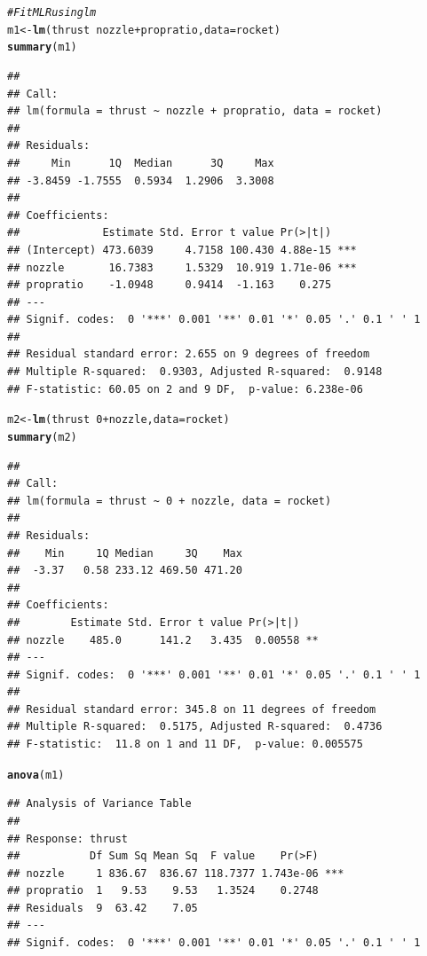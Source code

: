 \documentclass[oneside]{book}\usepackage[]{graphicx}\usepackage[dvipsnames,table,xcdraw]{xcolor}
\makeatletter
\newcommand{\hlnum}[1]{\textcolor[rgb]{0.686,0.059,0.569}{#1}}%
\newcommand{\hlcom}[1]{\textcolor[rgb]{0.678,0.584,0.686}{\textit{#1}}}%
\newcommand{\hlopt}[1]{\textcolor[rgb]{0,0,0}{#1}}%
\newcommand{\hlstd}[1]{\textcolor[rgb]{0.345,0.345,0.345}{#1}}%
\newcommand{\hlkwb}[1]{\textcolor[rgb]{0.69,0.353,0.396}{#1}}%
\newcommand{\hlkwc}[1]{\textcolor[rgb]{0.333,0.667,0.333}{#1}}%
\newcommand{\hlkwd}[1]{\textcolor[rgb]{0.737,0.353,0.396}{\textbf{#1}}}%
\newenvironment{kframe}{%
 \def\at@end@of@kframe{}%
 \ifinner\ifhmode%
  \def\at@end@of@kframe{\end{minipage}}%
  \begin{minipage}{\columnwidth}%
 \fi\fi%
 \def\FrameCommand##1{\hskip\@totalleftmargin \hskip-\fboxsep
 \colorbox{shadecolor}{##1}\hskip-\fboxsep
     \hskip-\linewidth \hskip-\@totalleftmargin \hskip\columnwidth}%
 \MakeFramed {\advance\hsize-\width
   \@totalleftmargin\z@ \linewidth\hsize
   \@setminipage}}%
 {\par\unskip\endMakeFramed%
 \at@end@of@kframe}
\newenvironment{knitrout}{}{} %
\makeatother
\begin{document}
\begin{knitrout}
\color{fgcolor}\begin{kframe}
\begin{alltt}
\hlcom{# Fit MLR using lm}
\hlstd{m1} \hlkwb{<-} \hlkwd{lm}\hlstd{(thrust} \hlopt{~} \hlstd{nozzle} \hlopt{+} \hlstd{propratio,} \hlkwc{data} \hlstd{= rocket)}
\hlkwd{summary}\hlstd{(m1)}
\end{alltt}
\begin{verbatim}
## 
## Call:
## lm(formula = thrust ~ nozzle + propratio, data = rocket)
## 
## Residuals:
##     Min      1Q  Median      3Q     Max 
## -3.8459 -1.7555  0.5934  1.2906  3.3008 
## 
## Coefficients:
##             Estimate Std. Error t value Pr(>|t|)    
## (Intercept) 473.6039     4.7158 100.430 4.88e-15 ***
## nozzle       16.7383     1.5329  10.919 1.71e-06 ***
## propratio    -1.0948     0.9414  -1.163    0.275    
## ---
## Signif. codes:  0 '***' 0.001 '**' 0.01 '*' 0.05 '.' 0.1 ' ' 1
## 
## Residual standard error: 2.655 on 9 degrees of freedom
## Multiple R-squared:  0.9303,	Adjusted R-squared:  0.9148 
## F-statistic: 60.05 on 2 and 9 DF,  p-value: 6.238e-06
\end{verbatim}
\begin{alltt}
\hlstd{m2} \hlkwb{<-} \hlkwd{lm}\hlstd{(thrust} \hlopt{~} \hlnum{0} \hlopt{+} \hlstd{nozzle,} \hlkwc{data} \hlstd{= rocket)}
\hlkwd{summary}\hlstd{(m2)}
\end{alltt}
\begin{verbatim}
## 
## Call:
## lm(formula = thrust ~ 0 + nozzle, data = rocket)
## 
## Residuals:
##    Min     1Q Median     3Q    Max 
##  -3.37   0.58 233.12 469.50 471.20 
## 
## Coefficients:
##        Estimate Std. Error t value Pr(>|t|)   
## nozzle    485.0      141.2   3.435  0.00558 **
## ---
## Signif. codes:  0 '***' 0.001 '**' 0.01 '*' 0.05 '.' 0.1 ' ' 1
## 
## Residual standard error: 345.8 on 11 degrees of freedom
## Multiple R-squared:  0.5175,	Adjusted R-squared:  0.4736 
## F-statistic:  11.8 on 1 and 11 DF,  p-value: 0.005575
\end{verbatim}
\begin{alltt}
\hlkwd{anova}\hlstd{(m1)}
\end{alltt}
\begin{verbatim}
## Analysis of Variance Table
## 
## Response: thrust
##           Df Sum Sq Mean Sq  F value    Pr(>F)    
## nozzle     1 836.67  836.67 118.7377 1.743e-06 ***
## propratio  1   9.53    9.53   1.3524    0.2748    
## Residuals  9  63.42    7.05                       
## ---
## Signif. codes:  0 '***' 0.001 '**' 0.01 '*' 0.05 '.' 0.1 ' ' 1
\end{verbatim}
\end{kframe}
\end{knitrout}
\end{document}
